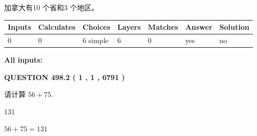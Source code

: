 \documentclass{ctexart}
\begin{document}
 
加拿大有10 个省和3 个地区。
 
 
\noindent{}
 
 
   
   
   
   
\noindent\begin{tabular}{|l|l|l|l|l|l|l|}
 \hline
Inputs & Calculates & Choices & Layers & Matches & Answer & Solution \\ \hline
 0  & 
 0  & 
 6
  simple  
  & 
 6  & 
 0  & 
  yes & 
  no 
  \\ \hline
 \end{tabular}
   
   
   
   
\noindent{}
   
   
   
   
\noindent\vspace{0.1in}\hspace{-0.08in} {\textbf{\Large{All inputs: }}}
   
   
  
\vspace{0.2in}
  
{\textbf{\Large{QUESTION
498.2 
 ( 1 , 1 , 6791 )
}}}
  
  
 
请计算 $ %
56 +  %
75 $.
 
 
 
\noindent{}
 
 

131
 
 
\noindent{}
 
 

 
 
 
\noindent{}
 
 

$ %
56 +  %
75=   %
131$
 
 
\noindent{}
 
 

 
   
   
   
\end{document}
